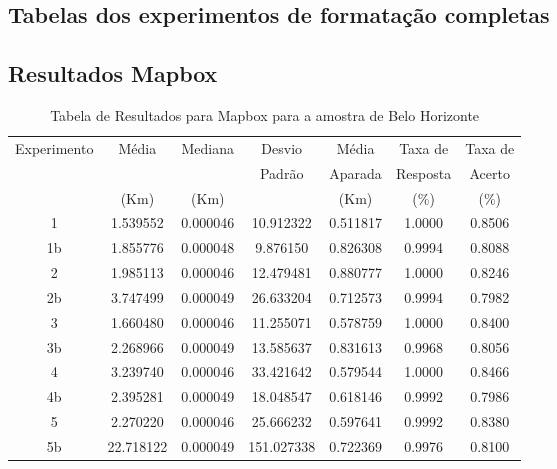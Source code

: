 
\begin{anexosenv}
\partanexos   %
\chapter{Tabelas dos experimentos de formatação completas}
\label{anexo_tabelas_completas}

\section{Resultados Mapbox}

\begin{table}[ht]
\centering
\begin{tabular}{|c|c|c|c|c|c|c|}
\hline
Experimento & Média & Mediana & Desvio & Média & Taxa de & Taxa de \\
 & & & Padrão & Aparada & Resposta & Acerto \\
 & (Km) & (Km) & & (Km) & (\%) & (\%) \\ \hline
1 & 1.539552 & 0.000046 & 10.912322 & 0.511817 & 1.0000 & 0.8506 \\ \hline
1b & 1.855776 & 0.000048 & 9.876150 & 0.826308 & 0.9994 & 0.8088 \\ \hline
2 & 1.985113 & 0.000046 & 12.479481 & 0.880777 & 1.0000 & 0.8246 \\ \hline
2b & 3.747499 & 0.000049 & 26.633204 & 0.712573 & 0.9994 & 0.7982 \\ \hline
3 & 1.660480 & 0.000046 & 11.255071 & 0.578759 & 1.0000 & 0.8400 \\ \hline
3b & 2.268966 & 0.000049 & 13.585637 & 0.831613 & 0.9968 & 0.8056 \\ \hline
4 & 3.239740 & 0.000046 & 33.421642 & 0.579544 & 1.0000 & 0.8466 \\ \hline
4b & 2.395281 & 0.000049 & 18.048547 & 0.618146 & 0.9992 & 0.7986 \\ \hline
5 & 2.270220 & 0.000046 & 25.666232 & 0.597641 & 0.9992 & 0.8380 \\ \hline
5b & 22.718122 & 0.000049 & 151.027338 & 0.722369 & 0.9976 & 0.8100 \\ \hline
\end{tabular}
\caption{Tabela de Resultados para Mapbox para a amostra de Belo Horizonte}
\label{tab:mapboxBH}
\end{table}


\end{anexosenv}
